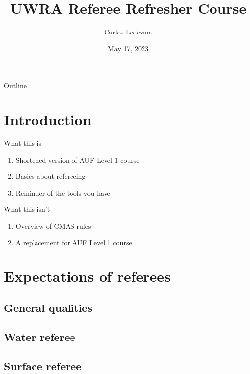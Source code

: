 \documentclass{beamer}
\title{UWRA Referee Refresher Course}
\author{Carlos Ledezma}
\date{May 17, 2023}
\begin{document}
\begin{frame}
    \titlepage{}
\end{frame}

\begin{frame}{Outline}
\end{frame}

\section{Introduction}

\begin{frame}{What this is}
    \begin{enumerate}
        \item Shortened version of AUF Level 1 course
        \item Basics about refereeing
        \item Reminder of the tools you have
    \end{enumerate}
\end{frame}

\begin{frame}{What this isn't}
    \begin{enumerate}
        \item Overview of CMAS rules
        \item A replacement for AUF Level 1 course
    \end{enumerate}
\end{frame}

\section{Expectations of referees}

\subsection{General qualities}



\subsection{Water referee}



\subsection{Surface referee}
\end{document}
